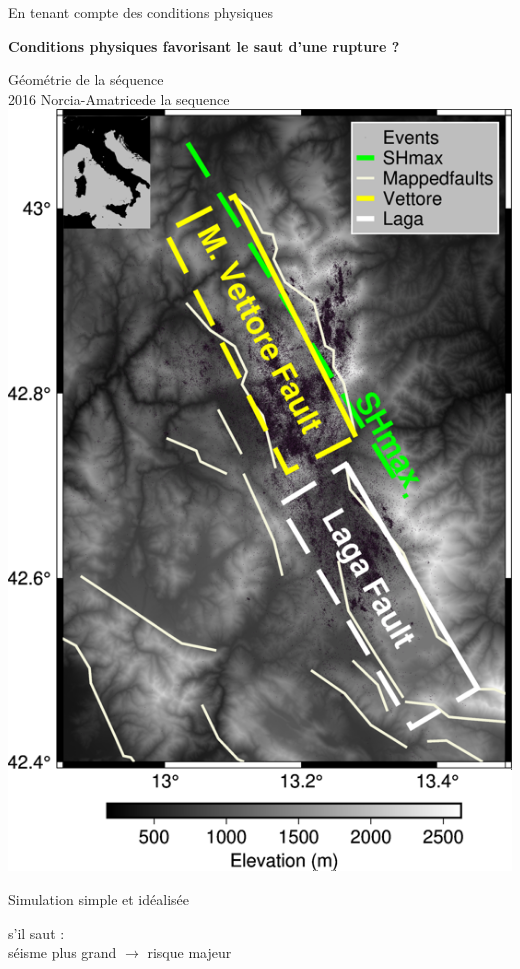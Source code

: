\documentclass{beamer}
\begin{document}
\begin{frame}
 {En tenant compte des conditions physiques}

{\bf Conditions physiques favorisant le saut d'une rupture ?}

\begin{minipage}{0.48\linewidth}
\vskip 0.2cm
\centering Géométrie de la séquence \\
2016 Norcia-Amatricede la sequence \\
\vskip 0.1cm
\includegraphics[width=0.7\linewidth]{images/Map_Italy.png}
\end{minipage}
\begin{minipage}{0.5\linewidth}
\vskip 0.3cm
\begin{center}
Simulation simple et idéalisée \\
\end{center}
\vskip -1cm  \hskip -3cm	
\begin{center}
\vskip -0.7cm {\small s'il saut : \\ séisme plus grand $\longrightarrow$ risque majeur }
\end{center}

\end{minipage}

\end{frame}
\end{document}
